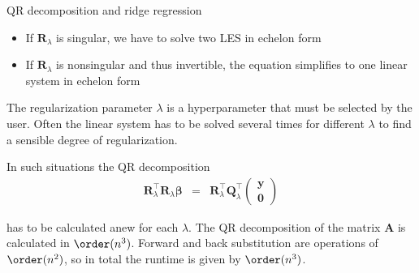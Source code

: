 \documentclass[11pt,compress,t,notes=noshow, xcolor=table]{beamer}
\begin{document}
\begin{vbframe}{QR decomposition and ridge regression}
\begin{itemize}
\item If $\bm{R}_\lambda$ is singular, we have to solve two LES in echelon form
\item If $\bm{R}_\lambda$ is nonsingular and thus invertible, the equation simplifies to one linear system in echelon form
\end{itemize}

\lz
The regularization parameter $\lambda$ is a hyperparameter that must be selected by the user. Often the linear system has to be solved several times for different $\lambda$ to find a sensible degree of regularization.
  
\medskip

In such situations the QR decomposition
\vspace*{-0.2cm}
\begin{eqnarray*}
\mathbf{R}_\lambda^\top\mathbf{R}_\lambda\boldsymbol{\beta} &=& \mathbf{R}_\lambda^\top\mathbf{Q}_\lambda^\top \begin{pmatrix} \mathbf{y} \\ \mathbf{0} \end{pmatrix} 
\end{eqnarray*}

has to be calculated anew for each $\lambda$. The QR decomposition of the matrix $\bm{A}$ is calculated in $\order(n^3)$. Forward and back substitution are operations of $\order(n^2)$, so in total the runtime is given by $\order(n^3)$.



\end{vbframe}
\end{document}
